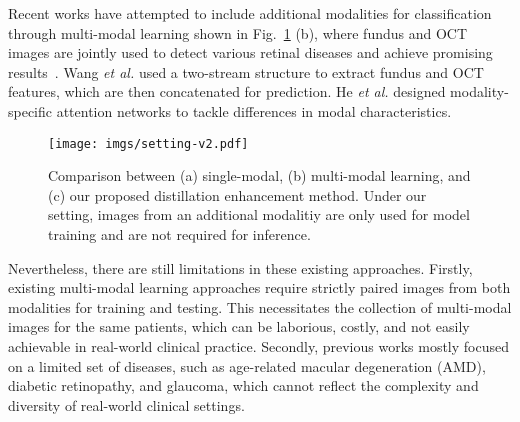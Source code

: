 \documentclass[runningheads]{llncs}
\newcommand{\wdai}[1]{{\color[rgb]{0.9,0.1,0.1}{#1}}}
\begin{document}
Recent works have attempted to include additional modalities for classification through multi-modal learning shown in Fig.~\ref{fig:setting} (b),
where fundus and OCT images are jointly used to detect various retinal diseases and achieve promising results~\cite{yoo2019possibility,wang2019two,wang2022learning,ou2021m,he2021multi,li2021multi,li2022multimodal}.
Wang \textit{et al.} \cite{wang2019two,wang2022learning} used a two-stream structure to extract fundus and OCT features, which are then concatenated for prediction. He \textit{et al.} \cite{he2021multi} designed modality-specific attention networks to tackle differences in modal characteristics.
\begin{figure}[t]
	\centering
	\texttt{[image: imgs/setting-v2.pdf]}
	\caption{Comparison between (a) single-modal, (b) multi-modal learning, and (c) our proposed distillation enhancement method. Under our setting, images from an additional modalitiy are only used for model training and are not required for inference.}
	\label{fig:setting}
\end{figure}
Nevertheless, there are still limitations in these existing approaches.
Firstly, existing multi-modal learning approaches require strictly paired images from both modalities for training and testing. This necessitates the collection of multi-modal images for the same patients, which can be laborious, costly, and not easily achievable in real-world clinical practice.
Secondly, previous works mostly focused on a limited set of diseases, such as age-related macular degeneration (AMD), diabetic retinopathy, and glaucoma, which cannot reflect the complexity and diversity of real-world clinical settings.  
\end{document}
